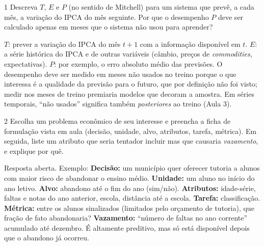 \documentclass[lista]{tmlnotas}
\begin{document}
\begin{exercicio}{1}
Descreva $T$, $E$ e $P$ (no sentido de Mitchell) para um sistema que prevê, a
cada mês, a variação do IPCA do mês seguinte. Por que o desempenho $P$ deve ser
calculado apenas em meses que o sistema não usou para aprender?
\end{exercicio}
\begin{solucao}
$T$: prever a variação do IPCA do mês $t+1$ com a informação disponível em $t$.
$E$: a série histórica do IPCA e de outras variáveis (câmbio, preços de
\emph{commodities}, expectativas). $P$: por exemplo, o erro absoluto médio das
previsões. O desempenho deve ser medido em meses não usados no treino porque o
que interessa é a qualidade da previsão para o futuro, que por definição não foi
visto; medir nos meses de treino premiaria modelos que decoram a amostra.
Em séries temporais, ``não usados'' significa também \emph{posteriores} ao
treino (Aula 3).
\end{solucao}

\begin{exercicio}{2}
Escolha um problema econômico de seu interesse e preencha a ficha de formulação
vista em aula (decisão, unidade, alvo, atributos, tarefa, métrica). Em seguida,
liste um atributo que seria tentador incluir mas que causaria \emph{vazamento},
e explique por quê.
\end{exercicio}
\begin{solucao}
Resposta aberta. Exemplo: \textbf{Decisão:} um município quer oferecer tutoria
a alunos com maior risco de abandonar o ensino médio. \textbf{Unidade:} um
aluno no início do ano letivo. \textbf{Alvo:} abandono até o fim do ano
(sim/não). \textbf{Atributos:} idade-série, faltas e notas do ano anterior,
escola, distância até a escola. \textbf{Tarefa:} classificação.
\textbf{Métrica:} entre os alunos sinalizados (limitados pelo orçamento de
tutoria), que fração de fato abandonaria? \textbf{Vazamento:} ``número de
faltas no ano corrente'' acumulado até dezembro. É altamente preditivo, mas só
está disponível depois que o abandono já ocorreu.
\end{solucao}
\end{document}
